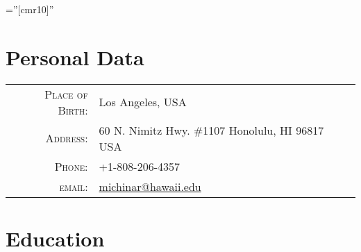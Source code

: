 \documentclass[a4paper,10pt]{article} %
\begin{document}
\pagestyle{empty} %

\font\fb=''[cmr10]'' %


\par{\bigskip\par} %

\section{Personal Data}

\begin{tabular}{rl}
\textsc{Place of Birth:} & Los Angeles, USA\\
\textsc{Address:} & 60 N. Nimitz Hwy. \#1107 Honolulu, HI 96817 USA\\
\textsc{Phone:} & +1-808-206-4357\\
\textsc{email:} & \href{mailto:michinar@hawaii.edu}{michinar@hawaii.edu}
\end{tabular}


\section{Education}
\end{document}
